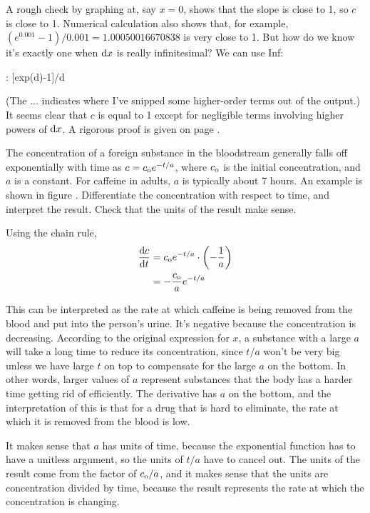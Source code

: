 \vfill\pagebreak

A rough check by graphing at, say $x=0$, shows that the slope is close to 1, so $c$ is close to
1. Numerical calculation also shows that, for example, $(e^{0.001}-1)/0.001=1.00050016670838$ is very close
to 1. But how do we know it's exactly one when $\textup{d} x$ is really infinitesimal?
We can use Inf:
\begin{Code}
  \ii : [exp(d)-1]/d
\end{Code}
(The ... indicates where I've snipped some higher-order terms out of the output.) It seems clear
that $c$ is equal to 1 except for negligible terms involving higher powers of $\textup{d} x$.
A rigorous proof is given on page \pageref{detour:exp}.\label{main:exp}

\vfill\pagebreak

\begin{eg}\label{eg:caffeine}
\egquestion The concentration of a foreign substance in the bloodstream generally falls off exponentially
with time as $c=c_{\textup{o}}e^{-t/a}$, where $c_{\textup{o}}$ is the initial concentration, and $a$ is a constant.
For caffeine in adults, $a$ is typically about 7 hours. An example is shown in figure . Differentiate the concentration with respect
to time, and interpret the result. Check that the units of the result make sense.

\eganswer Using the chain rule,
\begin{align*}
  \frac{\textup{d} c}{\textup{d} t} &= c_{\textup{o}}e^{-t/a}\cdot\left(-\frac{1}{a}\right) \\
                        &= -\frac{c_{\textup{o}}}{a}e^{-t/a}
\end{align*}

This can be interpreted as the rate at which caffeine is being removed from the blood and put into the person's urine. It's
negative because the concentration is decreasing.
According to the original expression for $x$, a substance with a large $a$ will take a long time to reduce its concentration,
since $t/a$ won't be very big unless we have large $t$ on top to compensate for the large $a$ on the bottom.
In other words, larger values of $a$ represent substances that the body has a harder time getting rid of efficiently.
The derivative has $a$ on the bottom, and the interpretation of this is that for a drug that is hard to eliminate,
the rate at which it is removed from the blood is low.

It makes sense that $a$ has units of time, because the exponential function has to have a unitless argument, so the units
of $t/a$ have to cancel out. The units of the result come from the factor of $c_{\textup{o}}/a$, and
it makes sense that the units are concentration divided by time, because the result
represents the rate at which the concentration is changing.
\end{eg}

